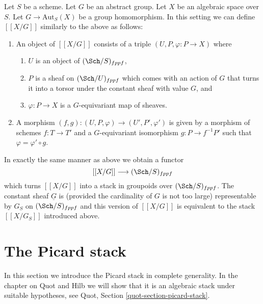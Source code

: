 \begin{remark}
\label{remark-X-mod-G-group}
Let $S$ be a scheme.
Let $G$ be an abstract group.
Let $X$ be an algebraic space over $S$.
Let $G \to \text{Aut}_S(X)$ be a group homomorphism.
In this setting we can define $[[X/G]]$ similarly
to the above as follows:
\begin{enumerate}
\item An object of $[[X/G]]$ consists of a triple
$(U, P, \varphi : P \to X)$ where
\begin{enumerate}
\item $U$ is an object of $(\Sch/S)_{fppf}$,
\item $P$ is a sheaf on $(\Sch/U)_{fppf}$ which comes
with an action of $G$ that turns it into a torsor under the constant
sheaf with value $G$, and
\item $\varphi : P \to X$ is a $G$-equivariant map of sheaves.
\end{enumerate}
\item A morphism
$(f, g) : (U, P, \varphi) \to (U', P', \varphi')$
is given by a morphism of schemes $f : T \to T'$
and a $G$-equivariant isomorphism
$g : P \to f^{-1}P'$ such that $\varphi = \varphi' \circ g$.
\end{enumerate}
In exactly the same manner as above we obtain a functor
$$
[[X/G]] \longrightarrow (\Sch/S)_{fppf}
$$
which turns $[[X/G]]$ into a stack in groupoids over $(\Sch/S)_{fppf}$.
The constant sheaf $\underline{G}$ is (provided the cardinality of $G$ is
not too large) representable by $G_S$ on $(\Sch/S)_{fppf}$
and this version of $[[X/G]]$ is equivalent to the stack
$[[X/G_S]]$ introduced above.
\end{remark}






\section{The Picard stack}
\label{section-picard-stack}

\noindent
In this section we introduce the Picard stack in complete generality.
In the chapter on Quot and Hilb we will show that it is an algebraic
stack under suitable hypotheses, see
Quot, Section \ref{quot-section-picard-stack}.

